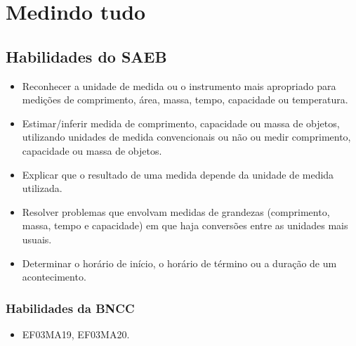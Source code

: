 \chapter{Medindo tudo}

\enlargethispage{3\baselineskip}

\section*{Habilidades do SAEB}

\begin{itemize}
\item Reconhecer a unidade de medida ou o instrumento mais apropriado para
medições de comprimento, área, massa, tempo, capacidade ou temperatura.

\item Estimar/inferir medida de comprimento, capacidade ou massa de objetos,
utilizando unidades de medida convencionais ou não ou medir comprimento,
capacidade ou massa de objetos.

\item Explicar que o resultado de uma medida depende da unidade de medida
utilizada.

\item Resolver problemas que envolvam medidas de grandezas (comprimento,
massa, tempo e capacidade) em que haja conversões entre as unidades mais
usuais.

\item Determinar o horário de início, o horário de término ou a duração de
um acontecimento.
\end{itemize}

\subsection{Habilidades da BNCC}

\begin{itemize}
\item EF03MA19, EF03MA20.
\end{itemize}



